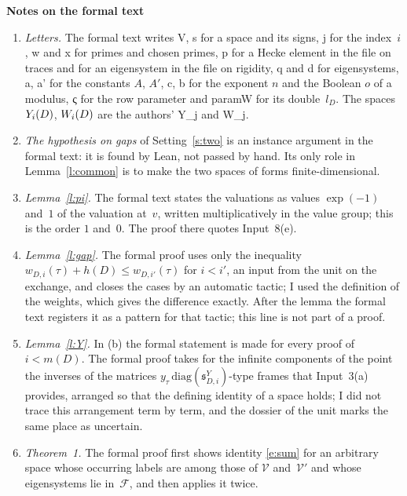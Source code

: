 \documentclass[11pt,a4paper]{article}
\newcommand{\leanfont}{\ttfamily\fontsize{8.6}{10.5}\selectfont\color{leancol}}
\newcommand{\m}[1]{\mbox{$#1$}}        %
\newcommand{\sect}[2]{\refstepcounter{section}\label{#2}\par\addvspace{19pt plus 4pt minus 2pt}\Needspace{7\baselineskip}%
  \noindent\llap{{\fontsize{13.2}{16}\selectfont\bfseries\color{inkfaint}\thesection}\hspace{9pt}}%
  {\fontsize{13.2}{16}\selectfont\bfseries\color{ink}#1}\par\nopagebreak\vspace{-1pt}}
\theoremstyle{plainx}
\theoremstyle{uprightx}
\newcommand{\cV}{{\mathcal V}}
\newcommand{\fs}{{\mathfrak s}}
\begin{document}
\sect{Notes on the formal text}{s:notes}
\begin{enumerate}[label=\textup{\arabic*.},leftmargin=1.6em,itemsep=5pt]
\item \emph{Letters.} The formal text writes {\leanfont V}, {\leanfont s} for a space and its signs,
{\leanfont j} for the index~$i$, {\leanfont w} and {\leanfont x} for primes and chosen primes, {\leanfont p} for a
Hecke element in the file on traces and for an eigensystem in the file on rigidity, {\leanfont q} and
{\leanfont d} for eigensystems, {\leanfont a}, {\leanfont a'} for the constants $A$, $A'$, {\leanfont c},
{\leanfont b} for the exponent $n$ and the Boolean $o$ of a modulus, {\leanfont ς} for the row parameter and
{\leanfont paramW} for its double~$l_D$. The spaces \m{\spaceY{D}{i}}, \m{\spaceW{D}{i}} are the authors'
{\leanfont Y\_j} and {\leanfont W\_j}.
\item \emph{The hypothesis on gaps} of Setting~\ref{s:two} is an instance argument in the formal text: it is
found by Lean, not passed by hand. Its only role in Lemma~\ref{l:common} is to make the two spaces of forms
finite-dimensional.
\item \emph{Lemma~\ref{l:pi}.} The formal text states the valuations as values \m{\exp(-1)} and~$1$ of the
valuation at~$v$, written multiplicatively in the value group; this is the order $1$ and~$0$. The proof there
quotes Input~8(e).
\item \emph{Lemma~\ref{l:gap}.} The formal proof uses only the inequality \m{w_{D,i}(\tau)+h(D)\le w_{D,i'}(\tau)}
for \m{i<i'}, an input from the unit on the exchange, and closes the cases by an automatic tactic; I used the
definition of the weights, which gives the difference exactly. After the lemma the formal text registers it as a
pattern for that tactic; this line is not part of a proof.
\item \emph{Lemma~\ref{l:Y}.} In (b) the formal statement is made for every proof of \m{i<m(D)}. The formal proof
takes for the infinite components of the point the inverses of the matrices
\m{y_\tau\,\mathrm{diag}(\fs^{Y}_{D,i})}-type frames that Input~3(a) provides, arranged so that the defining
identity of a space holds; I did not trace this arrangement term by term, and the dossier of the unit marks the
same place as uncertain.
\item \emph{Theorem~1.} The formal proof first shows identity \eqref{e:sum} for an arbitrary space whose occurring
labels are among those of $\cV$ and~$\cV'$ and whose eigensystems lie in~$\mathcal F$, and then applies it twice.

\end{enumerate}
\end{document}
